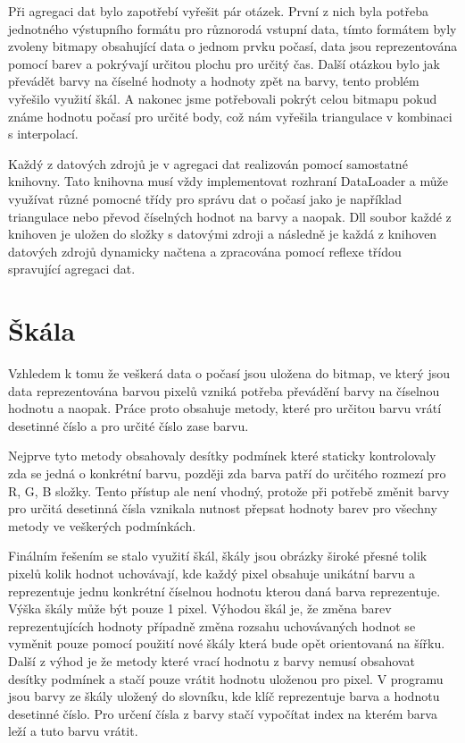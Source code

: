 \documentclass[czech,bachelor,dept460,male,csharp,cpdeclaration]{diploma}
\begin{document}
	Při agregaci dat bylo zapotřebí vyřešit pár otázek. První z nich byla potřeba jednotného výstupního formátu pro různorodá vstupní data, tímto formátem byly zvoleny bitmapy obsahující data o jednom prvku počasí, data jsou reprezentována pomocí barev a pokrývají určitou plochu pro určitý čas. Další otázkou bylo jak převádět barvy na číselné hodnoty a hodnoty zpět na barvy, tento problém vyřešilo využití škál. A nakonec jsme potřebovali pokrýt celou bitmapu pokud známe hodnotu počasí pro určité body, což nám vyřešila triangulace v kombinaci s interpolací.
	
	Každý z datových zdrojů je v agregaci dat realizován pomocí samostatné knihovny. Tato knihovna musí vždy implementovat rozhraní DataLoader a může využívat různé pomocné třídy pro správu dat o počasí jako je například triangulace nebo převod číselných hodnot na barvy a naopak. Dll soubor každé z knihoven je uložen do složky s datovými zdroji a následně je každá z knihoven datových zdrojů dynamicky načtena a zpracována pomocí reflexe třídou spravující agregaci dat.
	
	\section{Škála}
	
	Vzhledem k tomu že veškerá data o počasí jsou uložena do bitmap, ve který jsou data reprezentována barvou pixelů vzniká potřeba převádění barvy na číselnou hodnotu a naopak. Práce proto obsahuje metody, které pro určitou barvu vrátí desetinné číslo a pro určité číslo zase barvu.
	
	Nejprve tyto metody obsahovaly desítky podmínek které staticky kontrolovaly zda se jedná o konkrétní barvu, později zda barva patří do určitého rozmezí pro R, G, B složky. Tento přístup ale není vhodný, protože při potřebě změnit barvy pro určitá desetinná čísla vznikala nutnost přepsat hodnoty barev pro všechny metody ve veškerých podmínkách.
	
	Finálním řešením se stalo využití škál, škály jsou obrázky široké přesné tolik pixelů kolik hodnot uchovávají, kde každý pixel obsahuje unikátní barvu a reprezentuje jednu konkrétní číselnou hodnotu kterou daná barva reprezentuje. Výška škály může být pouze 1 pixel. Výhodou škál je, že změna barev reprezentujících hodnoty případně změna rozsahu uchovávaných hodnot se vyměnit pouze pomocí použití nové škály která bude opět orientovaná na šířku. Další z výhod je že metody které vrací hodnotu z barvy nemusí obsahovat desítky podmínek a stačí pouze vrátit hodnotu uloženou pro pixel. V programu jsou barvy ze škály uložený do slovníku, kde klíč reprezentuje barva a hodnotu desetinné číslo. Pro určení čísla z barvy stačí vypočítat index na kterém barva leží a tuto barvu vrátit.
	
\end{document}
